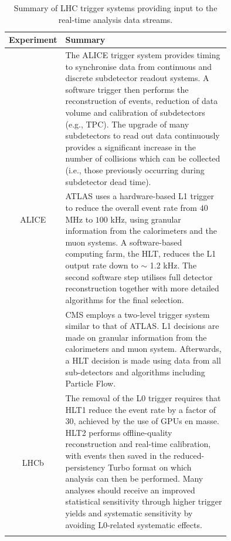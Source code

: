 \begin{table}[!ht]
    \centering
    \begin{tabular}{c|p{0.75\linewidth}}
        \thickhline
        \small{\textbf{Experiment}} & \textbf{Summary} \\
        \hline\hline
        \multirow{3}{*}{\small{ALICE}}
            & \small{The ALICE trigger system provides timing to synchronise data from continuous and discrete subdetector readout systems. A software trigger then performs the reconstruction of events, reduction of data volume and calibration of subdetectors (e.g., TPC). The upgrade of many subdetectors to read out data continuously provides a significant increase in the number of collisions which can be collected (i.e., those previously occurring during subdetector dead time).} \\
        \hline
        \multirow{3}{*}{\small{ATLAS}}
            & \small{ATLAS uses a hardware-based L1 trigger to reduce the overall event rate from $40$ MHz to $100$ kHz, using granular information from the calorimeters and the muon systems. A software-based computing farm, the HLT, reduces the L1 output rate down to $\sim$ 1.2 kHz. The second software step utilises full detector reconstruction together with more detailed algorithms for the final selection.} \\ \hline
        \multirow{3}{*}{\small{CMS}}
            & CMS employs a two-level trigger system similar to that of ATLAS. L1 decisions are made on granular information from the calorimeters and muon system. Afterwards, a HLT decision is made using data from all sub-detectors and algorithms including Particle Flow.
            \\ \hline
        \multirow{3}{*}{\small{LHCb}}
            & \small{The removal of the L0 trigger requires that HLT1 reduce the event rate by a factor of 30, achieved by the use of GPUs en masse. HLT2 performs offline-quality reconstruction and real-time calibration, with events then saved in the reduced-persistency Turbo format on which analysis can then be performed. Many analyses should receive an improved statistical sensitivity through higher trigger yields and systematic sensitivity by avoiding L0-related systematic effects.} \\
        \thickhline
    \end{tabular}
    \caption{Summary of LHC trigger systems providing input to the real-time analysis data streams.}
    \label{trigger-table}
\end{table}

